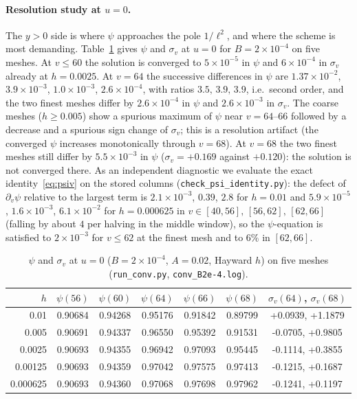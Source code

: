 \documentclass[11pt]{article}
\begin{document}
\paragraph{Resolution study at $u=0$.} The $y>0$ side is where $\psi$ approaches the pole $1/\ell^{2}$, and where the scheme is most demanding. Table~\ref{tab:conv} gives $\psi$ and $\sigma_v$ at $u=0$ for $B=2\times10^{-4}$ on five meshes. At $v\le60$ the solution is converged to $5\times10^{-5}$ in $\psi$ and $6\times10^{-4}$ in $\sigma_v$ already at $h=0.0025$. At $v=64$ the successive differences in $\psi$ are $1.37\times10^{-2}$, $3.9\times10^{-3}$, $1.0\times10^{-3}$, $2.6\times10^{-4}$, with ratios $3.5,\,3.9,\,3.9$, i.e.\ second order, and the two finest meshes differ by $2.6\times10^{-4}$ in $\psi$ and $2.6\times10^{-3}$ in $\sigma_v$. The coarse meshes ($h\ge0.005$) show a spurious maximum of $\psi$ near $v=64$--$66$ followed by a decrease and a spurious sign change of $\sigma_v$; this is a resolution artifact (the converged $\psi$ increases monotonically through $v=68$). At $v=68$ the two finest meshes still differ by $5.5\times10^{-3}$ in $\psi$ ($\sigma_v=+0.169$ against $+0.120$): the solution is not converged there. As an independent diagnostic we evaluate the exact identity~\eqref{eq:psiv} on the stored columns (\texttt{check\_psi\_identity.py}): the defect of $\partial_v\psi$ relative to the largest term is $2.1\times10^{-3}$, $0.39$, $2.8$ for $h=0.01$ and $5.9\times10^{-5}$, $1.6\times10^{-3}$, $6.1\times10^{-2}$ for $h=0.000625$ in $v\in[40,56],\,[56,62],\,[62,66]$ (falling by about $4$ per halving in the middle window), so the $\psi$-equation is satisfied to $2\times10^{-3}$ for $v\le62$ at the finest mesh and to $6\%$ in $[62,66]$.
\begin{table}[ht]\centering\small
\caption{$\psi$ and $\sigma_v$ at $u=0$ ($B=2\times10^{-4}$, $A=0.02$, Hayward $h$) on five meshes (\texttt{run\_conv.py}, \texttt{conv\_B2e-4.log}).}\label{tab:conv}
\begin{tabular}{rcccccc}
\toprule
$h$ & $\psi(56)$ & $\psi(60)$ & $\psi(64)$ & $\psi(66)$ & $\psi(68)$ & $\sigma_v(64)$, $\sigma_v(68)$\\\midrule
0.01 & 0.90684 & 0.94268 & 0.95176 & 0.91842 & 0.89799 & +0.0939, +1.1879\\
0.005 & 0.90691 & 0.94337 & 0.96550 & 0.95392 & 0.91531 & -0.0705, +0.9805\\
0.0025 & 0.90693 & 0.94355 & 0.96942 & 0.97093 & 0.95445 & -0.1114, +0.3855\\
0.00125 & 0.90693 & 0.94359 & 0.97042 & 0.97575 & 0.97413 & -0.1215, +0.1687\\
0.000625 & 0.90693 & 0.94360 & 0.97068 & 0.97698 & 0.97962 & -0.1241, +0.1197\\
\bottomrule
\end{tabular}
\end{table}
\end{document}
